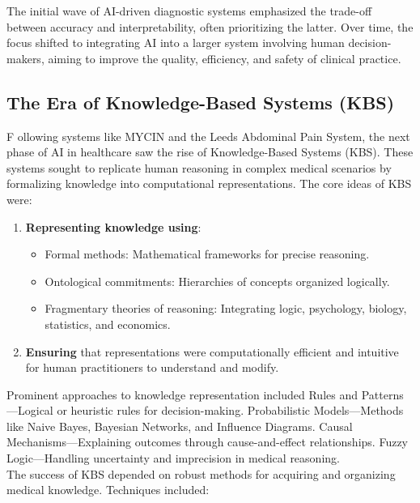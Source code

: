 \noindent The initial wave of AI-driven diagnostic systems emphasized the trade-off between accuracy and interpretability, often prioritizing the latter. Over time, the focus shifted to integrating AI into a larger system involving human decision-makers, aiming to improve the quality, efficiency, and safety of clinical practice.

\subsection{The Era of Knowledge-Based Systems (KBS)}
\lettrine{F}{ }ollowing systems like MYCIN and the Leeds Abdominal Pain System, the next phase of AI in healthcare saw the rise of Knowledge-Based Systems (KBS). These systems sought to replicate human reasoning in complex medical scenarios by formalizing knowledge into computational representations. The core ideas of KBS were:
\begin{enumerate}
    \item \textcolor{TUMRed}{\textbf{Representing knowledge using}}:
    \begin{itemize}
        \item Formal methods: Mathematical frameworks for precise reasoning.
        \item Ontological commitments: Hierarchies of concepts organized logically.
        \item Fragmentary theories of reasoning: Integrating logic, psychology, biology, statistics, and economics.
    \end{itemize}
    \item \textcolor{TUMRed}{\textbf{Ensuring}} that representations were computationally efficient and intuitive for human practitioners to understand and modify.
\end{enumerate}
\noindent Prominent approaches to knowledge representation included Rules and Patterns—Logical or heuristic rules for decision-making. Probabilistic Models—Methods like Naive Bayes, Bayesian Networks, and Influence Diagrams. Causal Mechanisms—Explaining outcomes through cause-and-effect relationships. Fuzzy Logic—Handling uncertainty and imprecision in medical reasoning.\\[\baselineskip]
\noindent The success of KBS depended on robust methods for acquiring and organizing medical knowledge. Techniques included:
